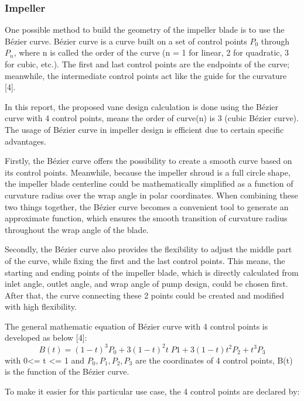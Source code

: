 \documentclass[11pt,a4paper]{scrartcl}
\begin{document}
\subsubsection{ Impeller}
One possible method to build the geometry of the impeller blade is to use the Bézier curve. Bézier curve is a curve built on a set of control points $P_0$ through $P_n$, where n is called the order of the curve (n = 1 for linear, 2 for quadratic, 3 for cubic, etc.). The first and last control points are the endpoints of the curve; meanwhile, the intermediate control points act like the guide for the curvature [4].\par
In this report, the proposed vane design calculation is done using the Bézier curve with 4 control points, means the order of curve(n) is 3 (cubic Bézier curve). The usage of Bézier curve in impeller design is efficient due to certain specific advantages.\par
Firstly, the Bézier curve offers the possibility to create a smooth curve based on its control points. Meanwhile, because the impeller shroud is a full circle shape, the impeller blade centerline could be mathematically simplified as a function of curvature radius over the wrap angle in polar coordinates. When combining these two things together, the Bézier curve becomes a convenient tool to generate an approximate function, which ensures the smooth transition of curvature radius throughout the wrap angle of the blade.\par
Secondly, the Bézier curve also provides the flexibility to adjust the middle part of the curve, while fixing the first and the last control points. This means, the starting and ending points of the impeller blade, which is directly calculated from inlet angle, outlet angle, and wrap angle of pump design, could be chosen first. After that, the curve connecting these 2 points could be created and modified with high flexibility.\par
The general mathematic equation of Bézier curve with 4 control points is developed as below [4]:
$$B(t)=(1-t)^3P_0+3(1-t)^2t\;P1+3(1-t)t^2P_2+t^3P_3$$
with 0<= t <= 1 and $P_0, P_1, P_2, P_3$ are the coordinates of 4 control points, B(t) is the function of the Bézier curve.\par

To make it easier for this particular use case, the 4 control points are declared by:\par
\end{document}
